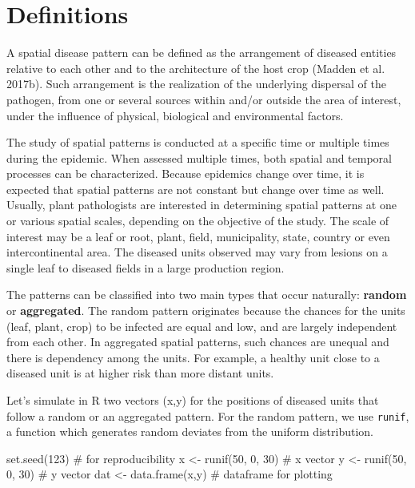 \documentclass[
  letterpaper,
  DIV=11,
  numbers=noendperiod]{scrreprt}
\newenvironment{Shaded}{\begin{snugshade}}{\end{snugshade}}
\newcommand{\CommentTok}[1]{\textcolor[rgb]{0.37,0.37,0.37}{#1}}
\newcommand{\DecValTok}[1]{\textcolor[rgb]{0.68,0.00,0.00}{#1}}
\newcommand{\FunctionTok}[1]{\textcolor[rgb]{0.28,0.35,0.67}{#1}}
\newcommand{\NormalTok}[1]{\textcolor[rgb]{0.00,0.23,0.31}{#1}}
\newcommand{\OtherTok}[1]{\textcolor[rgb]{0.00,0.23,0.31}{#1}}
\begin{document}
\hypertarget{definitions-1}{%
\section{Definitions}\label{definitions-1}}

A spatial disease pattern can be defined as the arrangement of diseased
entities relative to each other and to the architecture of the host crop
(Madden et al. 2017b). Such arrangement is the realization of the
underlying dispersal of the pathogen, from one or several sources within
and/or outside the area of interest, under the influence of physical,
biological and environmental factors.

The study of spatial patterns is conducted at a specific time or
multiple times during the epidemic. When assessed multiple times, both
spatial and temporal processes can be characterized. Because epidemics
change over time, it is expected that spatial patterns are not constant
but change over time as well. Usually, plant pathologists are interested
in determining spatial patterns at one or various spatial scales,
depending on the objective of the study. The scale of interest may be a
leaf or root, plant, field, municipality, state, country or even
intercontinental area. The diseased units observed may vary from lesions
on a single leaf to diseased fields in a large production region.

The patterns can be classified into two main types that occur naturally:
\textbf{random} or \textbf{aggregated}. The random pattern originates
because the chances for the units (leaf, plant, crop) to be infected are
equal and low, and are largely independent from each other. In
aggregated spatial patterns, such chances are unequal and there is
dependency among the units. For example, a healthy unit close to a
diseased unit is at higher risk than more distant units.

Let's simulate in R two vectors (x,y) for the positions of diseased
units that follow a random or an aggregated pattern. For the random
pattern, we use \texttt{runif}, a function which generates random
deviates from the uniform distribution.

\begin{Shaded}
\begin{Highlighting}[]
\FunctionTok{set.seed}\NormalTok{(}\DecValTok{123}\NormalTok{)          }\CommentTok{\# for reproducibility}
\NormalTok{x }\OtherTok{\textless{}{-}} \FunctionTok{runif}\NormalTok{(}\DecValTok{50}\NormalTok{, }\DecValTok{0}\NormalTok{, }\DecValTok{30}\NormalTok{)  }\CommentTok{\# x vector}
\NormalTok{y }\OtherTok{\textless{}{-}} \FunctionTok{runif}\NormalTok{(}\DecValTok{50}\NormalTok{, }\DecValTok{0}\NormalTok{, }\DecValTok{30}\NormalTok{)  }\CommentTok{\# y vector}
\NormalTok{dat }\OtherTok{\textless{}{-}} \FunctionTok{data.frame}\NormalTok{(x,y) }\CommentTok{\# dataframe for plotting}
\end{Highlighting}
\end{Shaded}
\end{document}
